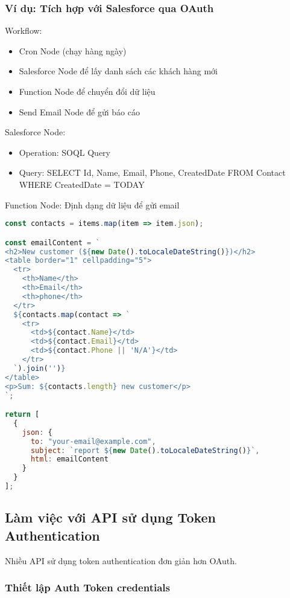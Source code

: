 \subsubsection{Ví dụ: Tích hợp với Salesforce qua OAuth}

Workflow:
\begin{itemize}
    \item Cron Node (chạy hàng ngày)
    \item Salesforce Node để lấy danh sách các khách hàng mới
    \item Function Node để chuyển đổi dữ liệu
    \item Send Email Node để gửi báo cáo
\end{itemize}

Salesforce Node:
\begin{itemize}
    \item Operation: SOQL Query
    \item Query: SELECT Id, Name, Email, Phone, CreatedDate FROM Contact WHERE CreatedDate = TODAY
\end{itemize}

Function Node: Định dạng dữ liệu để gửi email
\begin{lstlisting}[language=JavaScript]
const contacts = items.map(item => item.json);

const emailContent = `
<h2>New customer (${new Date().toLocaleDateString()})</h2>
<table border="1" cellpadding="5">
  <tr>
    <th>Name</th>
    <th>Email</th>
    <th>phone</th>
  </tr>
  ${contacts.map(contact => `
    <tr>
      <td>${contact.Name}</td>
      <td>${contact.Email}</td>
      <td>${contact.Phone || 'N/A'}</td>
    </tr>
  `).join('')}
</table>
<p>Sum: ${contacts.length} new customer</p>
`;

return [
  {
    json: {
      to: "your-email@example.com",
      subject: `report ${new Date().toLocaleDateString()}`,
      html: emailContent
    }
  }
];
\end{lstlisting}

\subsection{Làm việc với API sử dụng Token Authentication}

Nhiều API sử dụng token authentication đơn giản hơn OAuth.

\subsubsection{Thiết lập Auth Token credentials}

